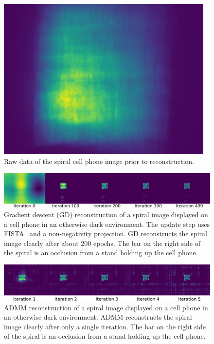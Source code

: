 \documentclass[final]{cvpr}
\begin{document}
\begin{figure}[t]
	\centering
	\includegraphics[width=1.0\linewidth]{images/raw-data-spiral}
	\caption{\label{fig:raw-data-spiral}Raw data of the spiral cell phone
		image prior to reconstruction.}
\end{figure}


\begin{figure}[t]
	\centering
	\includegraphics[width=1.0\linewidth]{images/gd-spiral-reconstruction-500iters}
	\caption{\label{fig:gd-spiral-reconstruction-500iters}
		Gradient descent (GD) reconstruction of a spiral image
		displayed on a cell phone in an otherwise dark environment.
		The update step uses FISTA~\cite{beck2009fast} and a
		non-negativity projection.
		GD reconstructs the spiral image clearly after about 200 epochs.
		The bar on the right side of the spiral is an occlusion from a
		stand holding up the cell phone.}
\end{figure}


\begin{figure}[t]
	\centering
	\includegraphics[width=1.0\linewidth]{images/admm-spiral-reconstruction-5iters}
	\caption{\label{fig:admm-spiral-reconstruction-5iters}
		ADMM reconstruction of a spiral image
		displayed on a cell phone in an otherwise dark environment.
		ADMM reconstructs the spiral image clearly after only a single
		iteration.
		The bar on the right side of the spiral is an occlusion from a
		stand holding up the cell phone.}
\end{figure}
\end{document}
